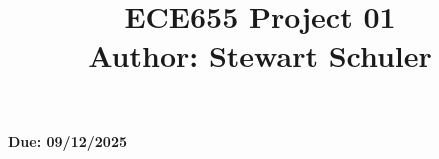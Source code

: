 \documentclass[a4paper,12pt]{article}
\begin{document}
 \title{ECE655 Project 01\\
                \vspace{4pt}
                \small{Author: Stewart Schuler}
                \vspace{-12pt}}
 \date{}
 \maketitle
 \begin{center}
 \textbf{Due: 09/12/2025}
 \end{center}

\tableofcontents





\end{document}
